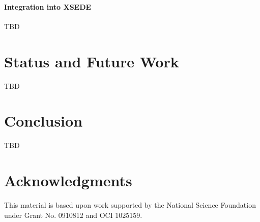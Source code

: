 \documentclass{tex/sig-alternate-2013}
\begin{document}
\paragraph{Integration into XSEDE}

TBD

\section{Status and Future Work}

TBD


\section{Conclusion}\label{S:conclusion}

TBD
 


\section{Acknowledgments}

This material is based upon work supported by the National Science Foundation under Grant No. 0910812 and OCI 1025159.


 

\end{document}
